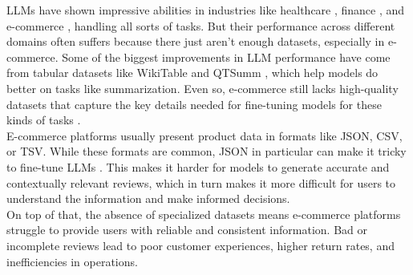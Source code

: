 \label{section:problema}
LLMs have shown impressive abilities in industries like healthcare \citep{He2023ReviewOS}, finance \citep{Varshney_2024}, and e-commerce \citep{peng2024ecellmgeneralizinglargelanguage}, handling all sorts of tasks. But their performance across different domains often suffers because there just aren't enough datasets, especially in e-commerce. Some of the biggest improvements in LLM performance have come from tabular datasets like WikiTable \citep{chen2021wikitabletlargescaledatatotextdataset} and QTSumm \citep{zhao2023qtsummqueryfocusedsummarizationtabular}, which help models do better on tasks like summarization. Even so, e-commerce still lacks high-quality datasets that capture the key details needed for fine-tuning models for these kinds of tasks \citep{macková2023promap}.
\\

E-commerce platforms usually present product data in formats like JSON, CSV, or TSV. While these formats are common, JSON in particular can make it tricky to fine-tune LLMs \citep{gao2024jsontuning}. This makes it harder for models to generate accurate and contextually relevant reviews, which in turn makes it more difficult for users to understand the information and make informed decisions.
\\

On top of that, the absence of specialized datasets means e-commerce platforms struggle to provide users with reliable and consistent information. Bad or incomplete reviews lead to poor customer experiences, higher return rates, and inefficiencies in operations.